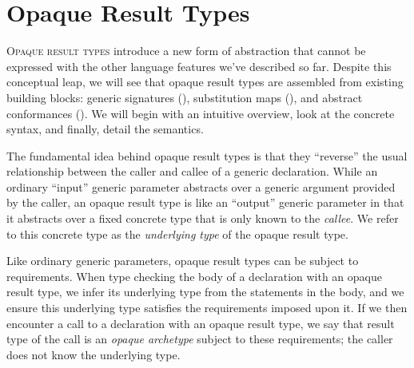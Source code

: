 \documentclass[../generics]{subfiles}
\begin{document}
\chapter{Opaque Result Types}\label{chap:opaque result types}

\lettrine{O}{paque result types} introduce a new form of abstraction that cannot be expressed with the other language features we've described so far. Despite this conceptual leap, we will see that opaque result types are assembled from existing building blocks: generic signatures (), substitution maps (), and abstract conformances (). We will begin with an intuitive overview, look at the concrete syntax, and finally, detail the semantics.

The fundamental idea behind opaque result types is that they ``reverse'' the usual relationship between the caller and callee of a generic declaration. While an ordinary ``input'' generic parameter abstracts over a generic argument provided by the caller, an opaque result type is like an ``output'' generic parameter in that it abstracts over a fixed concrete type that is only known to the \emph{callee}. We refer to this concrete type as the \emph{underlying type} of the opaque result type.

Like ordinary generic parameters, opaque result types can be subject to requirements. When type checking the body of a declaration with an opaque result type, we infer its underlying type from the statements in the body, and we ensure this underlying type satisfies the requirements imposed upon it. If we then encounter a call to a declaration with an opaque result type, we say that result type of the call is an \emph{opaque archetype} subject to these requirements; the caller does not know the underlying type.
\end{document}
